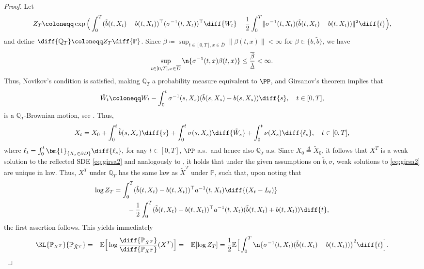 \documentclass[a4paper, 11pt, headings = small, abstract]{scrartcl}
\begin{document}
\begin{proof} 
	Let 
	\[
		Z_T
		\coloneqq \exp\Big(\int_0^T (\tilde{b}(t,X_t) - b(t,X_t))^\top (\sigma^{-1}(t,X_t))^{\top}\diff{W_t} - \frac{1}{2} \int_0^T \lVert \sigma^{-1}(t,X_t) (\tilde{b}(t,X_t) - b(t,X_t)) \rVert^2 \diff{t} \Big),
	\]
	and define $\diff{\mathbb{Q}_T} \coloneqq Z_T \diff{\mathbb{P}}$.
	Since $\overline{\beta} \coloneqq \sup_{t \in [0,T], x \in \overline{D}} \lVert \beta(t,x) \rVert < \infty$ for $\beta \in \{b , \tilde{b}\}$, we have 
	\[
		\sup_{t \in [0,T], x \in \overline{D}}\n{\sigma^{-1}(t,x) \beta(t,x)}
		\le\frac{\overline{\beta}}{\underline{\lambda}}  
		<\infty.
	\]
	Thus, Novikov's condition is satisfied, making $\mathbb{Q}_T$ a probability measure equivalent to $\PP$, and Girsanov's theorem implies that 
	\[
		\tilde{W}_t
		\coloneqq W_t - \int_0^t \sigma^{-1}(s,X_s)(\tilde{b}(s,X_s) - b(s,X_s)) \diff{s}, \quad t \in [0,T], 
	\]
	is a $\mathbb{Q}_T$-Brownian motion, see \cite[Chapter 3, Theorem 5.1, Corollary 5.13]{karatzas91}. 
	Thus,
	\[
		X_t
		= X_0 + \int_0^t \tilde{b}(s,X_s) \diff{s} + \int_0^t \sigma(s,X_s) \diff{\tilde{W}_s} + \int_0^t \nu(X_s) \diff{\ell_s}, \quad t \in [0,T],
	\]
	where $\ell_t  = \int_0^t \bm{1}_{\{X_s \in \partial D\}} \diff{\ell_s},$ for any $t \in [0,T]$, $\PP$-a.s.\ and hence also $\mathbb{Q}_T$-a.s. Since $X_0 \overset{d}{=} \tilde{X}_0$, it follows that $X^T$ is a weak solution to the reflected SDE \eqref{eq:girsa2} and analogously to \cite[Chapter 5, Proposition 3.10]{karatzas91}, it holds that under the given assumptions on $\tilde{b},\sigma$, weak solutions to \eqref{eq:girsa2} are unique in law. 
	Thus, $X^T$ under $\mathbb{Q}_T$ has the same law as $\tilde{X}^T$ under $\mathbb{P}$, such that, upon noting that
	\begin{align*}
		\log Z_T
		& = \int_0^T (\tilde{b}(t,X_t) - b(t,X_t))^\top a^{-1}(t,X_t) \diff{(X_t - L_t)}\\
        &\qquad - \frac{1}{2} \int_0^T  (\tilde{b}(t,X_t) - b(t,X_t))^\top a^{-1}(t,X_t)(\tilde{b}(t,X_t) + b(t,X_t)) \diff{t},
	\end{align*}
	the first assertion follows.
	This yields immediately
	\begin{align*} 
		\KL{\mathbb{P}_{X^T}}{\mathbb{P}_{\tilde{X}^T}}
		=-\mathbb{E}\Big[\log \frac{\diff{\mathbb{P}_{\tilde{X}^T}}}{\diff{\mathbb{P}_{X^T}}}(X^T) \Big]
		=-\mathbb{E}[\log Z_T]
		=\frac{1}{2}\mathbb{E}\Big[\int_0^T \n{\sigma^{-1}(t,X_t) (\tilde{b}(t,X_t) - b(t,X_t))}^2 \diff{t}\Big].
	\end{align*}
\end{proof}
\end{document}

